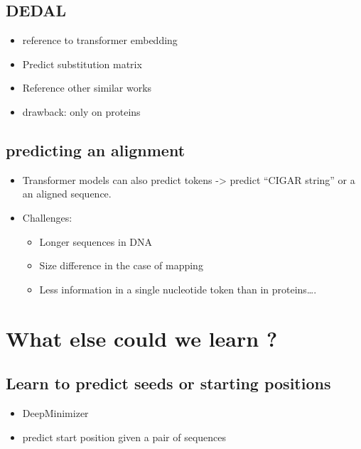 \documentclass[
  11pt,
  twoside]{scrbook}
\begin{document}
\hypertarget{dedal}{%
\subsection{DEDAL}\label{dedal}}

\begin{itemize}
\item
  reference to transformer embedding
\item
  Predict substitution matrix
\item
  Reference other similar works
\item
  drawback: only on proteins
\end{itemize}

\hypertarget{predicting-an-alignment}{%
\subsection{predicting an alignment}\label{predicting-an-alignment}}

\begin{itemize}
\item
  Transformer models can also predict tokens -\textgreater{} predict ``CIGAR string'' or a an aligned sequence.
\item
  Challenges:

  \begin{itemize}
  \item
    Longer sequences in DNA
  \item
    Size difference in the case of mapping
  \item
    Less information in a single nucleotide token than in proteins\ldots.
  \end{itemize}
\end{itemize}

\hypertarget{what-else-could-we-learn}{%
\section{What else could we learn ?}\label{what-else-could-we-learn}}

\hypertarget{learn-to-predict-seeds-or-starting-positions}{%
\subsection{Learn to predict seeds or starting positions}\label{learn-to-predict-seeds-or-starting-positions}}

\begin{itemize}
\item
  DeepMinimizer
\item
  predict start position given a pair of sequences
\end{itemize}
\end{document}

